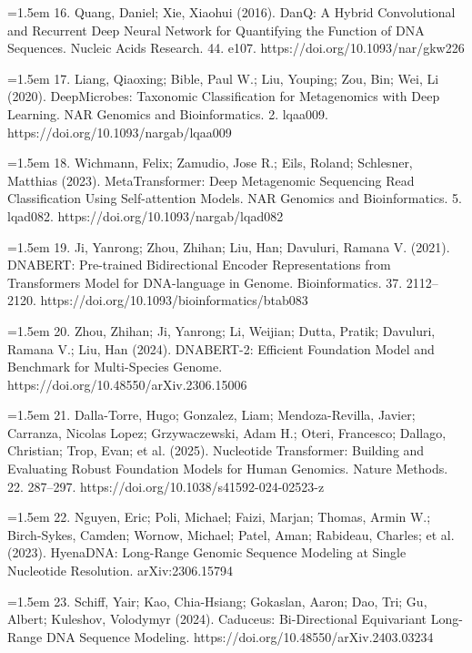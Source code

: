 \documentclass[10.5pt]{article}
\begin{document}
\hangindent=1.5em  16. Quang, Daniel; Xie, Xiaohui (2016). DanQ: A Hybrid Convolutional and Recurrent Deep Neural Network for Quantifying the Function of DNA Sequences. Nucleic Acids Research. 44. e107. https://doi.org/10.1093/nar/gkw226\par

\hangindent=1.5em  17. Liang, Qiaoxing; Bible, Paul W.; Liu, Youping; Zou, Bin; Wei, Li (2020). DeepMicrobes: Taxonomic Classification for Metagenomics with Deep Learning. NAR Genomics and Bioinformatics. 2. lqaa009. https://doi.org/10.1093/nargab/lqaa009\par

\hangindent=1.5em  18. Wichmann, Felix; Zamudio, Jose R.; Eils, Roland; Schlesner, Matthias (2023). MetaTransformer: Deep Metagenomic Sequencing Read Classification Using Self-attention Models. NAR Genomics and Bioinformatics. 5. lqad082. https://doi.org/10.1093/nargab/lqad082\par

\hangindent=1.5em  19. Ji, Yanrong; Zhou, Zhihan; Liu, Han; Davuluri, Ramana V. (2021). DNABERT: Pre-trained Bidirectional Encoder Representations from Transformers Model for DNA-language in Genome. Bioinformatics. 37. 2112--2120. https://doi.org/10.1093/bioinformatics/btab083\par

\hangindent=1.5em  20. Zhou, Zhihan; Ji, Yanrong; Li, Weijian; Dutta, Pratik; Davuluri, Ramana V.; Liu, Han (2024). DNABERT-2: Efficient Foundation Model and Benchmark for Multi-Species Genome. https://doi.org/10.48550/arXiv.2306.15006\par

\hangindent=1.5em  21. Dalla-Torre, Hugo; Gonzalez, Liam; Mendoza-Revilla, Javier; Carranza, Nicolas Lopez; Grzywaczewski, Adam H.; Oteri, Francesco; Dallago, Christian; Trop, Evan; et al. (2025). Nucleotide Transformer: Building and Evaluating Robust Foundation Models for Human Genomics. Nature Methods. 22. 287--297. https://doi.org/10.1038/s41592-024-02523-z\par

\hangindent=1.5em  22. Nguyen, Eric; Poli, Michael; Faizi, Marjan; Thomas, Armin W.; Birch-Sykes, Camden; Wornow, Michael; Patel, Aman; Rabideau, Charles; et al. (2023). HyenaDNA: Long-Range Genomic Sequence Modeling at Single Nucleotide Resolution. arXiv:2306.15794\par

\hangindent=1.5em  23. Schiff, Yair; Kao, Chia-Hsiang; Gokaslan, Aaron; Dao, Tri; Gu, Albert; Kuleshov, Volodymyr (2024). Caduceus: Bi-Directional Equivariant Long-Range DNA Sequence Modeling. https://doi.org/10.48550/arXiv.2403.03234\par
\end{document}
